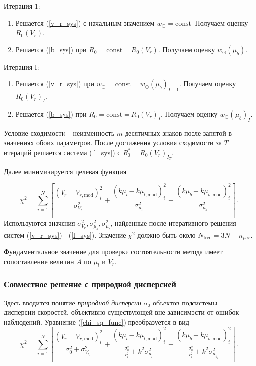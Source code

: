 \documentclass{matmex-diploma-custom}
\begin{document}
Итерация 1:
\begin{enumerate}
        \item Решается (\ref{v_r_sys}) с начальным значением $w_{\odot} = \mathrm{const}$. Получаем оценку $R_0(V_r)$.

        \item Решается (\ref{b_sys}) при $R_0 = \mathrm{const} = R_0(V_r)$. Получаем оценку $w_{\odot}(\mu_b)$.
\end{enumerate}
\par Итерация I:
\begin{enumerate}
\item Решается (\ref{v_r_sys}) при $w_{\odot} = \mathrm{const} = w_{\odot}(\mu_b)_{I - 1}$. Получаем оценку $R_0(V_r)_I$.
\item Решается (\ref{b_sys}) при $R_0 = \mathrm{const} = R_0(V_r)_I$. Получаем оценку $w_{\odot}(\mu_b)_I$.
\end{enumerate}
Условие сходимости -- неизменность $m$ десятичных знаков после запятой в значениях обоих параметров. После достижения условия сходимости за $T$ итераций решается система (\ref{l_sys}) с $R_0^{*}=R_0(V_r)_{I_T}$.

Далее минимизируется целевая функция

\begin{equation} \label{chi_sq_func}
                \chi^2 = \sum^N_{i = 1} \left[ \frac{\left( V_r - V_{r, \mathrm{mod}} \right)^2_i}{\sigma^2_{V_r}} + \frac{\left(k \mu_l - k \mu_{l, \mathrm{mod}} \right)^2_i}{\sigma^2_{\mu_l}} + \frac{\left(k \mu_b - k\mu_{b, \mathrm{mod}} \right)^2_i}{\sigma^2_{\mu_b}} \right].
	\end{equation}
Используются значения $\sigma^2_{V_r}, \sigma^2_{\mu_b}, \sigma^2_{\mu_l}$, найденные после итеративного решения систем (\ref{v_r_sys}) - (\ref{l_sys}). Значение $\chi^2$ должно быть около $N_{\mathrm{free}} = 3 N - n_{par}$. 

Фундаментальное значение для проверки состоятельности метода имеет сопоставление величин $A$ по $\mu_l$ и $V_r$.

\subsubsection{Совместное решение с природной дисперсией} \label{sigma_0_mode}
Здесь вводится понятие \textit{природной дисперсии} $\sigma_0$ объектов подсистемы -- дисперсии скоростей, объективно существующей вне зависимости от ошибок наблюдений. Уравнение (\ref{chi_sq_func}) преобразуется в вид 
\begin{equation} \label{chi_sq_func}
        \chi^2 = \sum^N_{i = 1} \left[ \frac{\left( V_r - V_{r, \mathrm{mod}} \right)^2_i}{\sigma_0^2 + \sigma^2_{V_{r_i}}} + \frac{\left(k \mu_l - k\mu_{l, \mathrm{mod}} \right)^2_i}{\frac{\sigma_0^2}{r_i^2} + k^2\sigma^2_{\mu_{l_i}}} + \frac{\left(k \mu_b - k\mu_{b, \mathrm{mod}} \right)^2_i}{\frac{\sigma_0^2}{r_i^2} + k^2\sigma^2_{\mu_{b_i}}} \right].
\end{equation}
\end{document}
